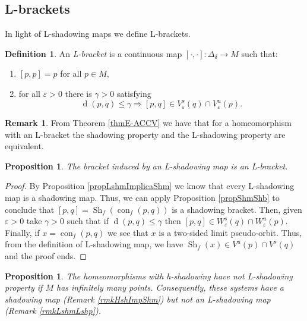 \documentclass[12pt]{amsart}
\theoremstyle{plain}
\newtheorem{prop}[thm]{Proposition}
\theoremstyle{definition}
\newtheorem{rmk}[thm]{Remark}
\newtheorem{df}[thm]{Definition}
\theoremstyle{remark}
\DeclareMathOperator{\dist}{d}
\DeclareMathOperator{\con}{con}
\DeclareMathOperator{\shm}{Sh}
\renewcommand{\epsilon}{\varepsilon}
\begin{document}

\subsection{L-brackets}
In light of L-shadowing maps we define L-brackets.
\begin{df}
	An \textit{L-bracket} is a continuous map $[\cdot,\cdot]\colon \Delta_\delta\to M$
	such that:
	\begin{enumerate}
		\item $[p,p]=p$ for all $p\in M$,
		\item for all $\epsilon>0$ there is $\gamma>0$ satisfying
		$$\dist(p,q)\leq\gamma \Rightarrow
		[p,q]\in V^s_\epsilon(q)\cap V^u_\epsilon(p).$$
	\end{enumerate}
\end{df}

\begin{rmk}
	From Theorem \ref{thmE-ACCV}
	we have that for a homeomorphism with an L-bracket
	the shadowing property and the L-shadowing property are equivalent.
\end{rmk}

\begin{prop}
	The bracket induced by an L-shadowing map is an L-bracket.
\end{prop}

\begin{proof}
	By Proposition \ref{propLshmImplicaShm} we know that every L-shadowing map is a shadowing map.
	Thus, we can apply Proposition \ref{propShmShb} to conclude that
	$[p,q]=\shm_f(\con_f(p,q))$ is a shadowing bracket.
	Then, given $\epsilon>0$ take $\gamma>0$ such that if
	$\dist(p,q)\leq\gamma$ then $[p,q]\in W^s_\epsilon(q)\cap W^u_\epsilon(p)$.
	Finally, if $x=\con_f(p,q)$ we see that $x$ is a two-sided limit pseudo-orbit.
	Thus, from the definition of L-shadowing map, we have $\shm_f(x)\in V^u(p)\cap V^s(q)$ and the proof ends.
\end{proof}

\begin{prop}
	\label{propOdoContraEj}
	The homeomorphisms with h-shadowing have not L-shadowing property if $M$ has infinitely many points.
	Consequently, these systems have a shadowing map (Remark \ref{rmkHshImpShm}) but not an L-shadowing map (Remark \ref{rmkLshmLshp}).
\end{prop}
\end{document}

